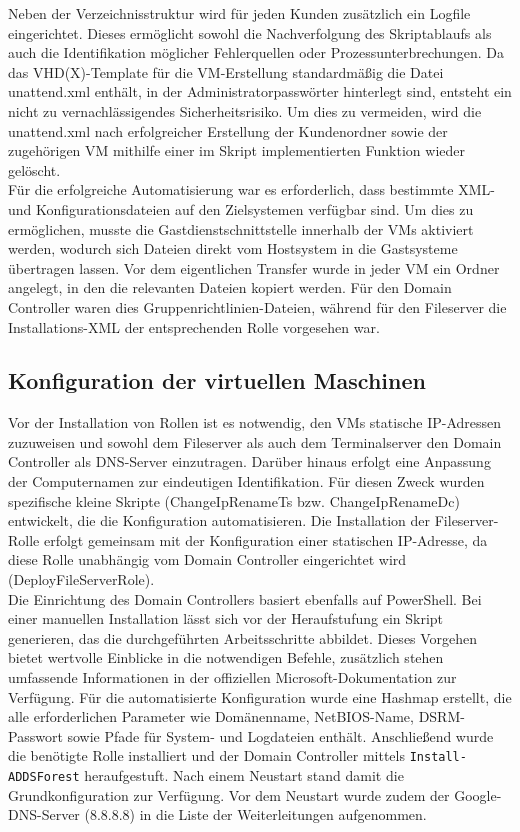 \documentclass[a4paper,12pt]{article}
\begin{document}
Neben der Verzeichnisstruktur wird für jeden Kunden zusätzlich ein Logfile eingerichtet. 
Dieses ermöglicht sowohl die Nachverfolgung des Skriptablaufs als auch die Identifikation möglicher Fehlerquellen oder Prozessunterbrechungen. 
Da das VHD(X)-Template für die VM-Erstellung standardmäßig die Datei unattend.xml enthält, in der Administratorpasswörter hinterlegt sind, entsteht ein nicht zu vernachlässigendes Sicherheitsrisiko. 
Um dies zu vermeiden, wird die unattend.xml nach erfolgreicher Erstellung der Kundenordner sowie der zugehörigen VM mithilfe einer im Skript implementierten Funktion wieder gelöscht.\\

Für die erfolgreiche Automatisierung war es erforderlich, dass bestimmte XML- und Konfigurationsdateien auf den Zielsystemen verfügbar sind. 
Um dies zu ermöglichen, musste die Gastdienstschnittstelle innerhalb der VMs aktiviert werden, wodurch sich Dateien direkt vom Hostsystem in die Gastsysteme übertragen lassen. 
Vor dem eigentlichen Transfer wurde in jeder VM ein Ordner angelegt, in den die relevanten Dateien kopiert werden. 
Für den Domain Controller waren dies Gruppenrichtlinien-Dateien, während für den Fileserver die Installations-XML der entsprechenden Rolle vorgesehen war.\\

\subsection{Konfiguration der virtuellen Maschinen}

Vor der Installation von Rollen ist es notwendig, den VMs statische IP-Adressen zuzuweisen und sowohl dem Fileserver als auch dem Terminalserver den Domain Controller als DNS-Server einzutragen. 
Darüber hinaus erfolgt eine Anpassung der Computernamen zur eindeutigen Identifikation. 
Für diesen Zweck wurden spezifische kleine Skripte (ChangeIpRenameTs bzw. ChangeIpRenameDc) entwickelt, die die Konfiguration automatisieren.
Die Installation der Fileserver-Rolle erfolgt gemeinsam mit der Konfiguration einer statischen IP-Adresse, da diese Rolle unabhängig vom Domain Controller eingerichtet wird (DeployFileServerRole).\\

Die Einrichtung des Domain Controllers basiert ebenfalls auf PowerShell. 
Bei einer manuellen Installation lässt sich vor der Heraufstufung ein Skript generieren, das die durchgeführten Arbeitsschritte abbildet. 
Dieses Vorgehen bietet wertvolle Einblicke in die notwendigen Befehle, zusätzlich stehen umfassende Informationen in der offiziellen Microsoft-Dokumentation zur Verfügung. 
Für die automatisierte Konfiguration wurde eine Hashmap erstellt, die alle erforderlichen Parameter wie Domänenname, NetBIOS-Name, DSRM-Passwort sowie Pfade für System- und Logdateien enthält. 
Anschließend wurde die benötigte Rolle installiert und der Domain Controller mittels \lstinline|Install-ADDSForest| heraufgestuft. 
Nach einem Neustart stand damit die Grundkonfiguration zur Verfügung. Vor dem Neustart wurde zudem der Google-DNS-Server (8.8.8.8) in die Liste der Weiterleitungen aufgenommen.\\
\end{document}

